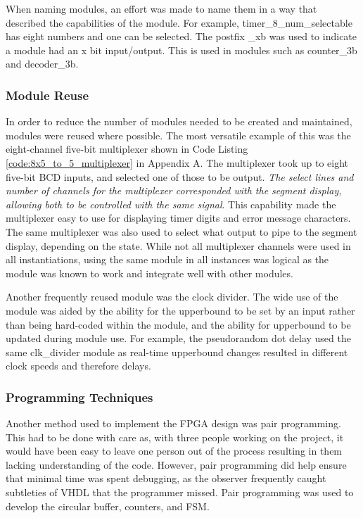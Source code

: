 \documentclass[11pt]{article}
\begin{document}
When naming modules, an effort was made to name them in a way that described the capabilities of the module. For example,  timer\_8\_num\_selectable has eight numbers and one can be selected. The postfix \_xb was used to indicate a module had an x bit input/output. This is used in modules such as counter\_3b and decoder\_3b.

\subsubsection{Module Reuse}

In order to reduce the number of modules needed to be created and maintained, modules were reused where possible. The most versatile example of this was the eight-channel five-bit multiplexer shown in Code Listing \ref{code:8x5_to_5_multiplexer} in Appendix A. The multiplexer took up to eight five-bit BCD inputs, and selected one of those to be output. \textit{The select lines and number of channels for the multiplexer corresponded with the segment display, allowing both to be controlled with the same signal}. This capability made the multiplexer easy to use for displaying timer digits and error message characters. The same multiplexer was also used to select what output to pipe to the segment display, depending on the state. While not all multiplexer channels were used in all instantiations, using the same module in all instances was logical as the module was known to work and integrate well with other modules.

Another frequently reused module was the clock divider. The wide use of the module was aided by the ability for the upperbound to be set by an input rather than being hard-coded within the module, and the ability for upperbound to be updated during module use.  For example, the pseudorandom dot delay used the same clk\_divider module as real-time upperbound changes resulted in different clock speeds and therefore delays.

\subsubsection{Programming Techniques}

Another method used to implement the FPGA design was pair programming. This had to be done with care as, with three people working on the project, it would have been easy to leave one person out of the process resulting in them lacking understanding of the code. However, pair programming did help ensure that minimal time was spent debugging, as the observer frequently caught subtleties of VHDL that the programmer missed. Pair programming was used to develop the circular buffer, counters, and FSM.
\end{document}
